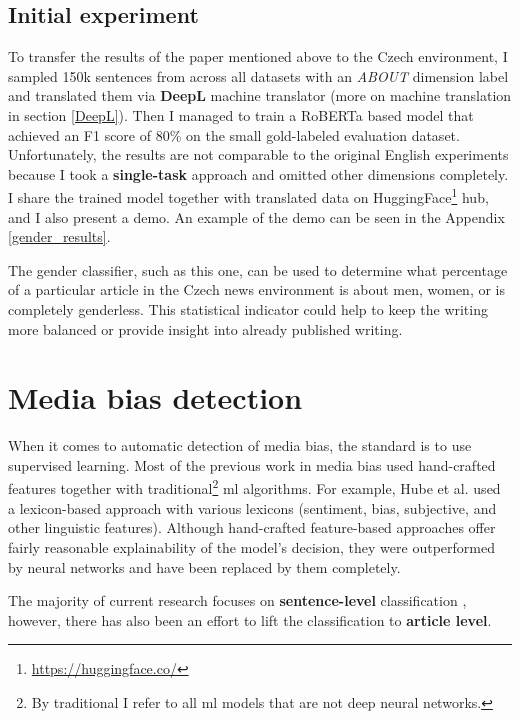 \subsection{Initial experiment}
To transfer the results of the paper mentioned above to the Czech environment, I sampled 150k sentences from across all datasets with an \textit{ABOUT} dimension label and translated them via \textbf{DeepL} machine translator (more on machine translation in section \ref{DeepL}). Then I managed to train a RoBERTa based model that achieved an F1 score of 80\% on the small gold-labeled evaluation dataset. 
Unfortunately, the results are not comparable to the original English experiments because I took a \textbf{single-task} approach and omitted other dimensions completely. I share the trained model together with translated data on HuggingFace\footnote{\url{https://huggingface.co/}} hub, and I also present a demo. An example of the demo can be seen in the Appendix \ref{gender_results}.

The gender classifier, such as this one, can be used to determine what percentage of a particular article in the Czech news environment is about men, women, or is completely genderless. This statistical indicator could help to keep the writing more balanced or provide insight into already published writing.






\section{Media bias detection}\label{mediabias}
When it comes to automatic detection of media bias, the standard is to use supervised learning. Most of the previous work in media bias used hand-crafted features together with traditional\footnote{By traditional I refer to all \Gls{ml} models that are not deep neural networks.} \Gls{ml} algorithms. For example, Hube et al. \cite{hube2018detecting} used a lexicon-based approach with various lexicons (sentiment, bias, subjective, and other linguistic features). Although hand-crafted feature-based approaches offer fairly reasonable explainability of the model's decision, they were outperformed by neural networks and have been replaced by them completely.

The majority of current research focuses on \textbf{sentence-level} classification \cite{sinha2021determining,Spinde2021MBIC,lee2021unifying,hube2019neural}, however, there has also been an effort to lift the classification to \textbf{article level}.

